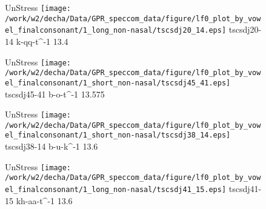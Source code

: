 \documentclass{article}
\begin{document}
\begin{figure}[t]
\begin{minipage}[b]{.24\textwidth}
UnStress
\centering
\texttt{[image: /work/w2/decha/Data/GPR\_speccom\_data/figure/lf0\_plot\_by\_vowel\_finalconsonant/1\_long\_non-nasal/tscsdj20\_14.eps]}
tscsdj20-14 k-qq-t\textasciicircum-1 13.4
\end{minipage}
\begin{minipage}[b]{.24\textwidth}
UnStress
\centering
\texttt{[image: /work/w2/decha/Data/GPR\_speccom\_data/figure/lf0\_plot\_by\_vowel\_finalconsonant/1\_short\_non-nasal/tscsdj45\_41.eps]}
tscsdj45-41 b-o-t\textasciicircum-1 13.575
\end{minipage}
\begin{minipage}[b]{.24\textwidth}
UnStress
\centering
\texttt{[image: /work/w2/decha/Data/GPR\_speccom\_data/figure/lf0\_plot\_by\_vowel\_finalconsonant/1\_short\_non-nasal/tscsdj38\_14.eps]}
tscsdj38-14 b-u-k\textasciicircum-1 13.6
\end{minipage}
\begin{minipage}[b]{.24\textwidth}
UnStress
\centering
\texttt{[image: /work/w2/decha/Data/GPR\_speccom\_data/figure/lf0\_plot\_by\_vowel\_finalconsonant/1\_long\_non-nasal/tscsdj41\_15.eps]}
tscsdj41-15 kh-aa-t\textasciicircum-1 13.6
\end{minipage}
\end{figure}
\end{document}
